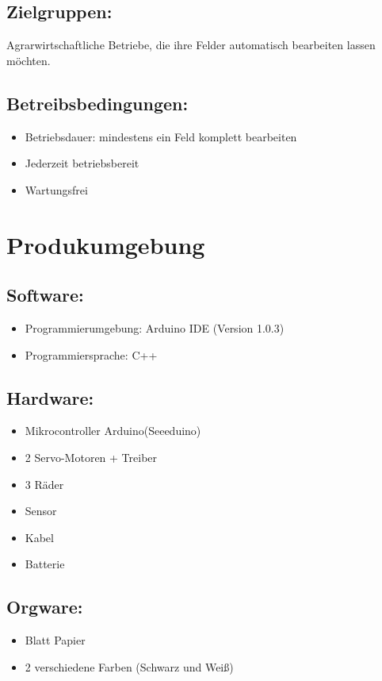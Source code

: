 \documentclass[12pt,a4paper]{article}
\begin{document}
\subsection{ Zielgruppen:}

Agrarwirtschaftliche Betriebe, die ihre Felder automatisch bearbeiten lassen möchten.


\subsection{ Betreibsbedingungen:}
\begin{itemize}
\item Betriebsdauer: mindestens ein Feld komplett bearbeiten
\item Jederzeit betriebsbereit
\item Wartungsfrei 
\end{itemize}



\section{ Produkumgebung}
\subsection{Software:}
\begin{itemize}
\item Programmierumgebung: Arduino IDE (Version 1.0.3)
\item Programmiersprache: C++
\end{itemize}
	
\subsection{Hardware:}
\begin{itemize}
\item Mikrocontroller Arduino(Seeeduino)
\item 2 Servo-Motoren + Treiber
\item 3 Räder 
\item Sensor
\item Kabel
\item Batterie
\end{itemize}

\subsection{Orgware:}
\begin{itemize}
\item Blatt Papier
\item 2 verschiedene Farben (Schwarz und Weiß)
\end{itemize}
\end{document}
